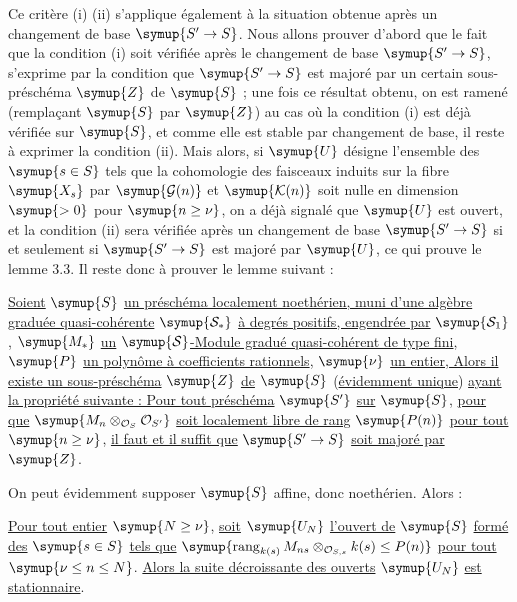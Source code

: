Ce critère (i) (ii) s'applique également à la situation obtenue après un
changement de base $\symup{S'\to S}$. Nous allons prouver d'abord que le
fait que la condition (i) soit vérifiée après le changement de base
$\symup{S'\to S}$, s'exprime par la condition que $\symup{S'\to S}$
est majoré par un certain sous-préschéma $\symup{Z}$ de $\symup{S}$ ; une fois ce résultat
obtenu, on est ramené (remplaçant $\symup{S}$ par $\symup{Z}$) au cas où la condition (i) est
déjà vérifiée sur $\symup{S}$, et comme elle est stable par changement de base, il
reste à exprimer la condition (ii). Mais alors, si $\symup{U}$ désigne l'ensemble des
$\symup{s\in S}$ tels que la cohomologie des faisceaux induits sur la fibre $\symup{X_s}$ par
$\symup{\mathcal G(n)}$ et $\symup{\mathcal K(n)}$ soit nulle en dimension $\symup{>0}$ pour
$\symup{n\geq\nu}$, on a déjà signalé que $\symup{U}$ est ouvert, et la condition (ii) sera
vérifiée après un changement de base $\symup{S'\to S}$ si et seulement si
$\symup{S'\to S}$ est majoré par $\symup{U}$, ce qui prouve le lemme 3.3. Il reste
donc à prouver le lemme suivant :

 \uline{Soient} $\symup{S}$ \uline{un préschéma localement noethérien, muni d'une
algèbre graduée quasi-cohérente} $\symup{\mathcal S_*}$ \uline{à degrés positifs, engendrée par}
$\symup{\mathcal S_1}$, $\symup{M_*}$ \uline{un} $\symup{\mathcal S}$\uline{-Module gradué quasi-cohérent de type
fini}, $\symup{P}$ \uline{un polynôme à coefficients rationnels}, $\symup{\nu}$ \uline{un entier, Alors il
existe un sous-préschéma} $\symup{Z}$ \uline{de} $\symup{S}$ (\uline{évidemment unique})
\uline{ayant la propriété suivante : Pour tout préschéma} $\symup{S'}$ \uline{sur} $\symup{S}$, \uline{pour que}
$\symup{M_n\otimes_{\mathcal O_S}\mathcal O_{S'}}$ \uline{soit localement libre de rang} $\symup{P(n)}$
\uline{pour tout} $\symup{n\geq\nu}$, \uline{il faut et il suffit que} $\symup{S'\to S}$ \uline{soit majoré
par} $\symup{Z}$.

On peut évidemment supposer $\symup{S}$ affine, donc noethérien. Alors :

 \uline{Pour tout entier} $\symup{N\geq\nu}$, \uline{soit} $\symup{U_N}$ \uline{l'ouvert de} $\symup{S}$
\uline{formé des} $\symup{s\in S}$ \uline{tels que}
$\symup{\operatorname{rang}_{k(s)}M_{ns}\otimes_{\mathcal O_{S,s}}k(s)\leq P(n)}$
\uline{pour tout} $\symup{\nu\leq n\leq N}$. \uline{Alors la suite décroissante des ouverts} $\symup{U_N}$ \uline{est stationnaire}.

